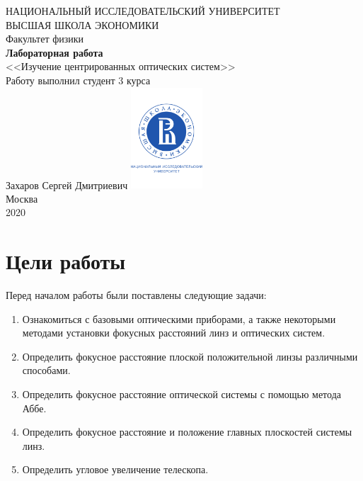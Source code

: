 \documentclass[a4paper, 12pt]{article}
\begin{document}
	\begin{titlepage}
		\begin{center}
			$$$$
			$$$$
			$$$$
			$$$$
			{\Large{НАЦИОНАЛЬНЫЙ ИССЛЕДОВАТЕЛЬСКИЙ УНИВЕРСИТЕТ}}\\
			\vspace{0.1cm}
			{\Large{ВЫСШАЯ ШКОЛА ЭКОНОМИКИ}}\\
			\vspace{0.25cm}
			{\large{Факультет физики}}\\
			\vspace{5.5cm}
			{\Huge\textbf{{Лабораторная работа}}}\\%
			\vspace{1cm}
			{\LARGE{<<Изучение центрированных оптических систем>>}}\\%
			\vspace{2cm}
			{Работу выполнил студент 3 курса}\\
			{Захаров Сергей Дмитриевич}
			\vfill
			\includegraphics[width = 0.2\textwidth]{HSElogo}\\
			\vfill
			Москва\\
			2020
		\end{center}
	\end{titlepage}
	
\tableofcontents

\newpage

\section{Цели работы}

Перед началом работы были поставлены следующие задачи:

\begin{enumerate}
	
	\item Ознакомиться с базовыми оптическими приборами, а также некоторыми методами установки фокусных расстояний линз и оптических систем. 
	
	\item Определить фокусное расстояние плоской положительной линзы различными способами.
	
	\item Определить фокусное расстояние оптической системы с помощью метода Аббе.
	
	\item Определить фокусное расстояние и положение главных плоскостей системы линз.
	
	\item Определить угловое увеличение телескопа.
\end{enumerate}
\end{document}
